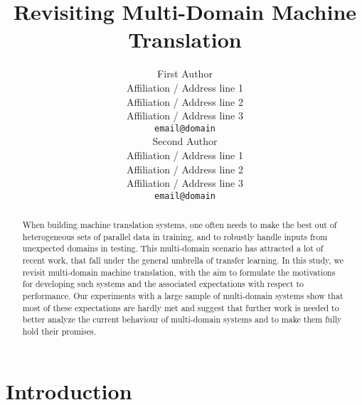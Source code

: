\documentclass[11pt,a4paper]{article}
\title{Revisiting Multi-Domain Machine Translation}
\author{First Author \\
  Affiliation / Address line 1 \\
  Affiliation / Address line 2 \\
  Affiliation / Address line 3 \\
  {\tt email@domain} \\\And
  Second Author \\
  Affiliation / Address line 1 \\
  Affiliation / Address line 2 \\
  Affiliation / Address line 3 \\
  {\tt email@domain} \\}
\date{}
\newcommand{\fyDone}[1]{\done[FY]\Todo[FY:]{\textcolor{orange}{#1}}}
\begin{document}
\maketitle
\begin{abstract}
  When building machine translation systems, one often needs to make the best out of heterogeneous sets of parallel data in training, and to robustly handle inputs from unexpected domains in testing. This multi-domain scenario has attracted a lot of recent work, that fall under the general umbrella of transfer learning.
In this study, we revisit multi-domain machine translation, with the aim to formulate the motivations for developing such systems and the associated expectations with respect to performance. Our experiments with a large sample of multi-domain systems show that most of these expectations are hardly met and suggest that further work is needed to better analyze the current behaviour of multi-domain systems and to make them fully hold their promises.
  \fyDone{Write abstract}
\end{abstract}

\section{Introduction} \label{sec:intro}

%
% 
\end{document}

